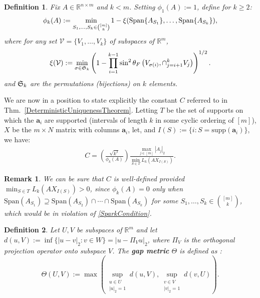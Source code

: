 \documentclass[journal, twocolumn]{IEEEtran}
\newtheorem{definition}{Definition}
\newtheorem{remark}{Remark}
\begin{document}

\begin{definition}\label{SpecialSupportSet}
Fix $A \in \mathbb{R}^{n \times m}$ and $k < m$. Setting $\phi_1(A) := 1$, define for $k \geq 2$:
\begin{align}\label{rho}
\phi_k(A) := \min_{ S_1,\ldots,S_k \in {[m] \choose k} } 1 - \xi( \text{\rm Span}\{A_{S_1}\}, \ldots,  \text{\rm Span}\{A_{S_k}\}),
\end{align}
where for any set $\mathcal{V} = \{V_1, \ldots, V_k\}$ of subspaces of $\mathbb{R}^m$, 
\begin{align}\label{xidef}
\xi(\mathcal{V}) := \min_{\sigma \in \frak{S}_k} \left(1 - \prod_{i=1}^{k-1} \sin^2  \theta_F \left(V_{\sigma(i)}, \cap_{j=i+1}^k V_j \right)  \right)^{1/2}.
\end{align}
%
and $\frak{S}_{k}$ are the permutations (bijections) on $k$ elements. 
\end{definition}

We are now in a position to state explicitly the constant $C$ referred to in Thm.~\ref{DeterministicUniquenessTheorem}. Letting $T$ be the set of supports on which the $\mathbf{a}_i$ are supported (intervals of length $k$ in some cyclic ordering of $[m]$), $X$ be the $m \times N$ matrix with columns $\mathbf{a}_i$, let, and $I(S) := \{i : S = \text{supp}(\mathbf{a}_i)\}$, we have:
\begin{align}\label{Cdef}
C = \left( \frac{ \sqrt{k^3}}{ \phi_k(A) } \right) \frac{\max_{j \in [m]} |A_j|_2}{\min_{S \in T} L_k(AX_{I(S)})}.
\end{align}

\begin{remark}\label{nonzero}
We can be sure that $C$ is well-defined provided $\min_{S \in T} L_k(AX_{I(S)}) > 0$, since $\phi_k(A) = 0$ only when $\text{Span}(A_{S_1}) \supseteq \text{Span}(A_{S_2}) \cap \cdots \cap \text{Span}(A_{S_k})$ for some $S_1, \ldots, S_k \in {[m] \choose k}$, which would be in violation of \eqref{SparkCondition}.
\end{remark}

\begin{definition}\label{GapMetricDef}
Let $U, V$ be subspaces of $\mathbb{R}^m$ and let $d(u,V) := \inf\{|u-v|_2: v \in W\} = |u - \Pi_V u|_2$, where $\Pi_V$ is the orthogonal projection operator onto subspace $V$. The \textbf{gap metric} $\Theta$ is defined as \cite{Akhiezer13}:
\begin{equation}\label{SubspaceMetric}
\Theta(U,V) := \max\left( \sup_{\substack{u \in U \\ |u|_2 = 1}} d(u,V), \sup_{\substack{v \in V \\ |v|_2 = 1}} d(v,U) \right).
\end{equation}
\end{definition}
\end{document}
